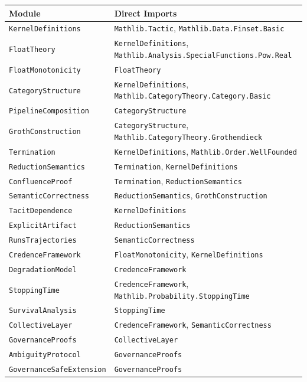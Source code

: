 \begin{center}
\begin{tabular}{lp{8cm}}
\toprule
Module & Direct Imports \\
\midrule
\texttt{KernelDefinitions} & \texttt{Mathlib.Tactic}, \texttt{Mathlib.Data.Finset.Basic} \\
\texttt{FloatTheory} & \texttt{KernelDefinitions}, \texttt{Mathlib.Analysis.SpecialFunctions.Pow.Real} \\
\texttt{FloatMonotonicity} & \texttt{FloatTheory} \\
\texttt{CategoryStructure} & \texttt{KernelDefinitions}, \texttt{Mathlib.CategoryTheory.Category.Basic} \\
\texttt{PipelineComposition} & \texttt{CategoryStructure} \\
\texttt{GrothConstruction} & \texttt{CategoryStructure}, \texttt{Mathlib.CategoryTheory.Grothendieck} \\
\texttt{Termination} & \texttt{KernelDefinitions}, \texttt{Mathlib.Order.WellFounded} \\
\texttt{ReductionSemantics} & \texttt{Termination}, \texttt{KernelDefinitions} \\
\texttt{ConfluenceProof} & \texttt{Termination}, \texttt{ReductionSemantics} \\
\texttt{SemanticCorrectness} & \texttt{ReductionSemantics}, \texttt{GrothConstruction} \\
\texttt{TacitDependence} & \texttt{KernelDefinitions} \\
\texttt{ExplicitArtifact} & \texttt{ReductionSemantics} \\
\texttt{RunsTrajectories} & \texttt{SemanticCorrectness} \\
\texttt{CredenceFramework} & \texttt{FloatMonotonicity}, \texttt{KernelDefinitions} \\
\texttt{DegradationModel} & \texttt{CredenceFramework} \\
\texttt{StoppingTime} & \texttt{CredenceFramework}, \texttt{Mathlib.Probability.StoppingTime} \\
\texttt{SurvivalAnalysis} & \texttt{StoppingTime} \\
\texttt{CollectiveLayer} & \texttt{CredenceFramework}, \texttt{SemanticCorrectness} \\
\texttt{GovernanceProofs} & \texttt{CollectiveLayer} \\
\texttt{AmbiguityProtocol} & \texttt{GovernanceProofs} \\
\texttt{GovernanceSafeExtension} & \texttt{GovernanceProofs} \\
\bottomrule
\end{tabular}
\end{center}

